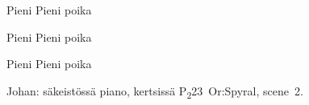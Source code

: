 \documentclass[12pt,a4paper]{article}
\begin{document}
\begin{SBChorus}
Pieni     Pieni poika
  
\end{SBChorus}

\begin{SBVerse*}
\end{SBVerse*}

\begin{SBChorus}
Pieni     Pieni poika
  
\end{SBChorus}

\begin{SBVerse*}
    
 
\end{SBVerse*}

\begin{SBChorus}
Pieni     Pieni poika
  
\end{SBChorus}


{\SBLyricNoteFont Johan: säkeistössä piano, kertsissä
P\textsubscript{2}23~Or:Spyral, scene~2.}
\end{document}
